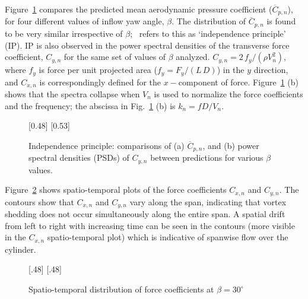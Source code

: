 Figure~\ref{fig:Compared_Yawed_Re20k} compares the predicted mean aerodynamic
pressure coefficient ($\overline{C}_{p,n}$), for four different values of
inflow yaw angle, $\beta$. The distribution of $\overline{C}_{p,n}$ is found to
be very similar irrespective of $\beta$;~\cite{zdravkovich2003flow} refers to
this as `independence principle' (IP). IP is also observed in the power
spectral densities of the transverse force coefficient, $C_{y,n}$ for the same
set of values of $\beta$ analyzed. $C_{y,n}=2\, f_y/ (\rho V^2_n)$, where $f_y$
is force per unit projected area ($f_y = F_y/(L\,D)$) in the $y$ direction, and $C_{x,n}$
is correspondingly defined for the $x-$component of force.
Figure~\ref{fig:Compared_Yawed_Re20k} (b) shows that the spectra collapse when
$V_n$ is used to normalize the force coefficients and the frequency; the
abscissa in Fig.~\ref{fig:Compared_Yawed_Re20k} (b) is $k_n = fD/V_n$.  
%
\begin{figure}[htb!]
  [0.48\linewidth]
    {}
  \hspace*{\fill}
  [0.53\linewidth]
    {}
  \caption{Independence principle: comparisons of (a) $\overline{C}_{p,n}$, and
    (b) power spectral densities (PSDs) of $C_{y,n}$ between predictions for various $\beta$ values.}
\label{fig:Compared_Yawed_Re20k}
\end{figure}

Figure~\ref{fig:Spatial_temporal_CxCyRe20k} shows spatio-temporal plots of the
force coefficients $C_{x,n}$ and $C_{y,n}$. The contours show that $C_{x,n}$
and $C_{y,n}$ vary along the span, indicating that vortex shedding does not
occur simultaneously along the entire span. A spatial drift from left to right
with increasing time can be seen in the contours (more visible in the $C_{x,n}$
spatio-temporal plot) which is indicative of spanwise flow over the cylinder.
%
\begin{figure}[htb!]
    [.48\linewidth]{}
    [.48\linewidth]{}
  \hspace*{\fill}
  \caption{Spatio-temporal distribution of force coefficients at
  $\beta=30^\circ$}
  \label{fig:Spatial_temporal_CxCyRe20k}
\end{figure}

